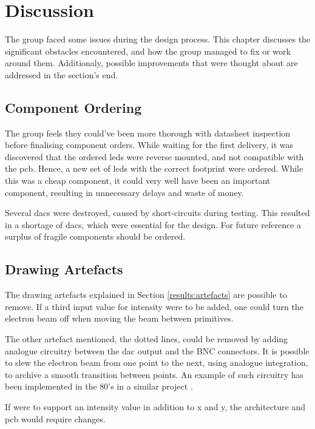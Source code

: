 \chapter{Discussion}

The group faced some issues during the design process.
This chapter discusses the significant obstacles encountered, and how the group managed to fix or work around them.
Additionaly, possible improvements that were thought about are addressed in the section's end.



\section{Component Ordering}
The group feels they could've been more thorough with datasheet inspection before finalising component orders.
While waiting for the first delivery, it was discovered that the ordered \gls{led}s were reverse mounted, and not compatible with the \gls{pcb}.
Hence, a new set of \gls{led}s with the correct footprint were ordered.
While this was a cheap component, it could very well have been an important component, resulting in unnecessary delays and waste of money.

Several \gls{dac}s were destroyed, caused by short-circuits during testing.
This resulted in a shortage of \gls{dac}s, which were essential for the design.
For future reference a surplus of fragile components should be ordered.



\section{Drawing Artefacts}
\label{discussion:artefacts}
The drawing artefacts explained in Section \ref{results:artefacts} are possible to remove.
If a third input value for intensity were to be added, one could turn the electron beam off when moving the beam between primitives.

The other artefact mentioned, the dotted lines, could be removed by adding analogue circuitry between the \gls{dac} output and the BNC connectors.
It is possible to slew the electron beam from one point to the next, using analogue integration, to archive a smooth transition between points.
An example of such circuitry has been implemented in the 80's in a similar project \cite{vector-graphic-crt}.

If \vthreek were to support an intensity value in addition to x and y, the architecture and \gls{pcb} would require changes.

